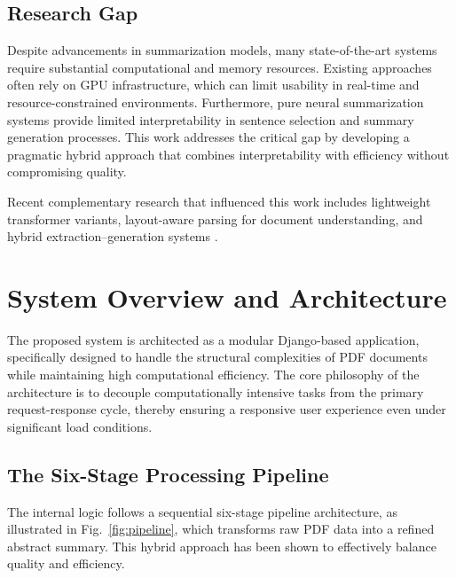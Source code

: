 \documentclass[conference]{IEEEtran}
\begin{document}
\subsection{Research Gap}
Despite advancements in summarization models, many state-of-the-art systems require substantial computational and memory resources\cite{1, 9, 12}. Existing approaches often rely on GPU infrastructure, which can limit usability in real-time and resource-constrained environments\cite{2, 16}. Furthermore, pure neural summarization systems provide limited interpretability in sentence selection and summary generation processes\cite{20, 7, 4, 14}. This work addresses the critical gap by developing a pragmatic hybrid approach that combines interpretability with efficiency without compromising quality.

Recent complementary research that influenced this work includes lightweight transformer variants, layout-aware parsing for document understanding, and hybrid extraction–generation systems \cite{25, 26, 27, 28, 29, 30, 34}.



\section{System Overview and Architecture}

The proposed system is architected as a modular Django-based application\cite{13}, specifically designed to handle the structural complexities of PDF documents while maintaining high computational efficiency. The core philosophy of the architecture is to decouple computationally intensive tasks from the primary request-response cycle\cite{16}, thereby ensuring a responsive user experience even under significant load conditions.

\subsection{The Six-Stage Processing Pipeline}

The internal logic follows a sequential six-stage pipeline architecture, as illustrated in Fig.~\ref{fig:pipeline}, which transforms raw PDF data into a refined abstract summary. This hybrid approach has been shown to effectively balance quality and efficiency.
\end{document}
